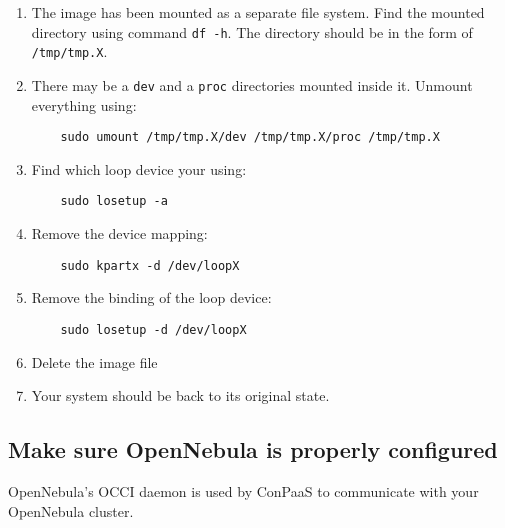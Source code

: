 \documentclass[10pt]{article}
\begin{document}
\begin{enumerate}
\item The image has been mounted as a separate file system. Find the
  mounted directory using command \verb+df -h+. The directory should
  be in the form of \verb+/tmp/tmp.X+.
  
\item There may be a \verb+dev+ and a \verb+proc+ directories mounted
  inside it. Unmount everything using:
  \begin{verbatim}
    sudo umount /tmp/tmp.X/dev /tmp/tmp.X/proc /tmp/tmp.X
  \end{verbatim}
  
\item Find which loop device your using:
  \begin{verbatim}
    sudo losetup -a
  \end{verbatim}
  
\item Remove the device mapping:
  \begin{verbatim}
    sudo kpartx -d /dev/loopX
  \end{verbatim}
  
\item Remove the binding of the loop device:
  \begin{verbatim}
    sudo losetup -d /dev/loopX
  \end{verbatim}

\item Delete the image file 

\item Your system should be back to its original state.
\end{enumerate}

\subsection{Make sure OpenNebula is properly configured}

OpenNebula's OCCI daemon is used by ConPaaS to communicate with your
OpenNebula cluster.
\end{document}
